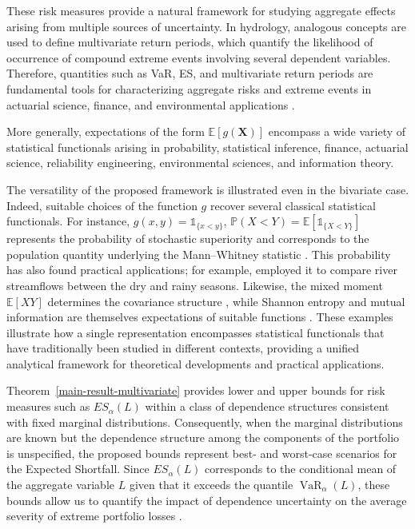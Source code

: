 \documentclass[12pt]{article}
\begin{document}
 These risk measures provide a natural framework for studying aggregate effects arising from multiple sources of uncertainty. In hydrology, analogous concepts are used to define multivariate return periods, which quantify the likelihood of occurrence of compound extreme events involving several dependent variables. Therefore, quantities such as VaR, ES, and multivariate return periods are fundamental tools for characterizing aggregate risks and extreme events in actuarial science, finance, and environmental applications \citep{McNeil2015,Salvadori2016}.
 
 More generally, expectations of the form 
$\mathbb{E}[g(\boldsymbol X)]$  encompass a wide variety of statistical functionals arising in probability, statistical inference, finance, actuarial science, reliability engineering, environmental sciences, and information theory.

The versatility of the proposed framework is illustrated even in the bivariate case. Indeed, suitable choices of the function $g$ recover several classical statistical functionals. For instance, $g(x,y)=\mathds 1_{\{x<y\}}$,
$
\mathbb{P}(X<Y)=\mathbb{E}\left[\mathds{1}_{\{X<Y\}}\right]
$
represents the probability of stochastic superiority and corresponds to the population quantity underlying the Mann–Whitney statistic  \citep{MannWhitney1947,Hollander2014}. This probability has also found practical applications; for example, \cite{OtinianoMaluf2019} employed it to compare river streamflows between the dry and rainy seasons. Likewise, the mixed moment $\mathbb{E}[XY]$ determines the covariance structure \citep{CasellaBerger2002}, while Shannon entropy and mutual information are themselves expectations of suitable functions \citep{CoverThomas2006}. These examples illustrate how a single representation encompasses statistical functionals that have traditionally been studied in different contexts, providing a unified analytical framework for theoretical developments and practical applications.


Theorem~\ref{main-result-multivariate} provides lower and upper bounds for risk measures such as 
$ES_{\alpha}(L)$ within a class of dependence structures consistent with fixed 
marginal distributions. Consequently, when the marginal distributions are known 
but the dependence structure among the components of the portfolio is unspecified, 
the proposed bounds represent best- and worst-case scenarios for the 
Expected Shortfall. Since $ES_{\alpha}(L)$ corresponds to the conditional mean 
of the aggregate variable $L$ given that it exceeds the quantile 
$\operatorname{VaR}_{\alpha}(L)$, these bounds allow us to quantify the impact of 
dependence uncertainty on the average severity of extreme portfolio losses 
\citep{McNeil2015, Embrechts2013}.
\end{document}
